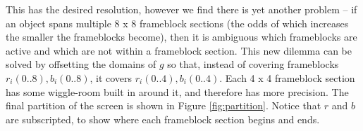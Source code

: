 \documentclass[conference]{IEEEtran}
\begin{document}
This has the desired resolution,
however we find there is yet another problem --
if an object spans multiple 8 x 8 frameblock sections
(the odds of which increases the smaller the frameblocks become),
then it is ambiguous which frameblocks are active and which are not
within a frameblock section.
%
%
This new dilemma can be solved by offsetting the domains of $g$ so that,
instead of covering frameblocks
$r_i(0..8),b_i(0..8)$,
it covers $r_i(0..4),b_i(0..4)$.
Each 4 x 4 frameblock section has some wiggle-room built in around it,
and therefore has more precision.
The final partition of the screen is shown in Figure \ref{fig:partition}.
Notice that $r$ and $b$ are subscripted, to show where each
frameblock section begins and ends.
\end{document}

